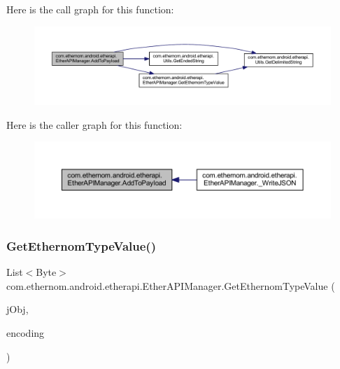 Here is the call graph for this function\+:\nopagebreak
\begin{figure}[H]
\begin{center}
\leavevmode
\includegraphics[width=350pt]{classcom_1_1ethernom_1_1android_1_1etherapi_1_1_ether_a_p_i_manager_aea87690e440c3985866b3e9a4340c930_cgraph}
\end{center}
\end{figure}
Here is the caller graph for this function\+:\nopagebreak
\begin{figure}[H]
\begin{center}
\leavevmode
\includegraphics[width=350pt]{classcom_1_1ethernom_1_1android_1_1etherapi_1_1_ether_a_p_i_manager_aea87690e440c3985866b3e9a4340c930_icgraph}
\end{center}
\end{figure}
\mbox{\label{classcom_1_1ethernom_1_1android_1_1etherapi_1_1_ether_a_p_i_manager_ab888c8e041fe1ed3e6aabf931aa2cb57}} 
\subsubsection{\texorpdfstring{Get\+Ethernom\+Type\+Value()}{GetEthernomTypeValue()}}
{\footnotesize\ttfamily List$<$Byte$>$ com.\+ethernom.\+android.\+etherapi.\+Ether\+A\+P\+I\+Manager.\+Get\+Ethernom\+Type\+Value (\begin{DoxyParamCaption}\item[{J\+S\+O\+N\+Object}]{j\+Obj,  }\item[{int}]{encoding }\end{DoxyParamCaption})\hspace{0.3cm}{\ttfamily [private]}}



